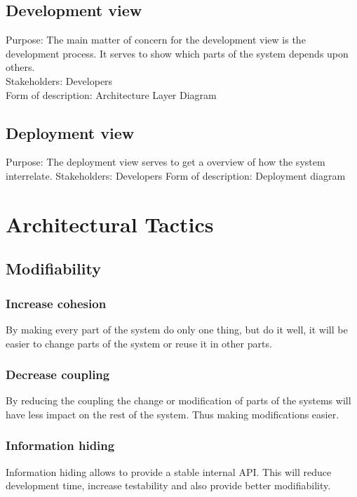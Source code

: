 \documentclass[11pt]{book}
\begin{document}
\subsection{Development view}\label{subsec:developmentViewDescription}
Purpose: The main matter of concern for the development view is the development process. It serves to show which parts of the system depends upon others. \\
Stakeholders: Developers\\
Form of description: Architecture Layer Diagram

\subsection{Deployment view}\label{subsec:deploymentViewDescription}
Purpose: The deployment view serves to get a overview of how the system interrelate.
Stakeholders: Developers
Form of description: Deployment diagram

\section{Architectural Tactics}

\subsection{Modifiability}

\subsubsection{Increase cohesion}
By making every part of the system do only one thing, but do it well, it will be easier to change parts of the system or reuse it in other parts.

\subsubsection{Decrease coupling}
By reducing the coupling the change or modification of parts of the systems will have less impact on the rest of the system. Thus making modifications easier.

\subsubsection{Information hiding}
Information hiding allows to provide a stable internal API. This will reduce development time, increase testability and also provide better modifiability.
\end{document}
